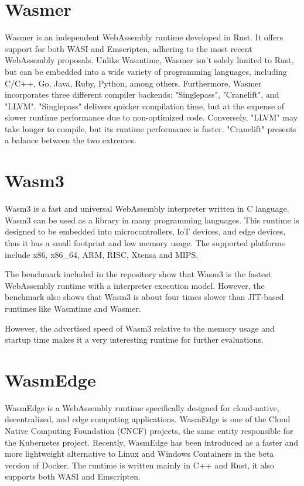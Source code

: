 \section{Wasmer}
\label{sec:wasmer}

Wasmer \cite{wasmerinc_2023_wasmer} is an independent WebAssembly runtime developed in Rust. It offers support for both WASI and Emscripten, adhering to the most recent WebAssembly proposals. Unlike Wasmtime, Wasmer isn't solely limited to Rust, but can be embedded into a wide variety of programming languages, including C/C++, Go, Java, Ruby, Python, among others. Furthermore, Wasmer incorporates three different compiler backends: "Singlepass", "Cranelift", and "\gls{LLVM}". "Singlepass" delivers quicker compilation time, but at the expense of slower runtime performance due to non-optimized code. Conversely, "LLVM" may take longer to compile, but its runtime performance is faster. "Cranelift" presents a balance between the two extremes.

\section{Wasm3}
\label{sec:wasm3}

Wasm3 \cite{shymanskyy_2023_wasm3} is a fast and universal WebAssembly interpreter written in C language. Wasm3 can be used as a library in many programming languages. This runtime is designed to be embedded into microcontrollers, IoT devices, and edge devices, thus it has a small footprint and low memory usage. The supported platforms include x86, x86\_64, ARM, RISC, Xtensa and MIPS.

The benchmark included in the repository \cite{shymanskyy_2023_wasm3} show that Wasm3 is the fastest \gls{WebAssembly} runtime with a interpreter execution model. However, the benchmark also shows that Wasm3 is about four times slower than JIT-based runtimes like Wasmtime and Wasmer. 

However, the advertised speed of Wasm3 relative to the memory usage and startup time makes it a very interesting runtime for further evaluations.

\section{WasmEdge}
\label{sec:wasmedge}

WasmEdge \cite{he_2023_wasmedge} is a WebAssembly runtime specifically designed for cloud-native, decentralized, and \gls{edge computing} applications. WasmEdge is one of the Cloud Native Computing Foundation (CNCF) \cite{cloudnativecomputingfoundation_2023_cloud} projects, the same entity responsible for the Kubernetes project. Recently, WasmEdge has been introduced as a faster and more lightweight alternative to Linux and Windows Containers in the beta version of Docker. The runtime is written mainly in C++ and Rust, it also supports both WASI and Emscripten. 

